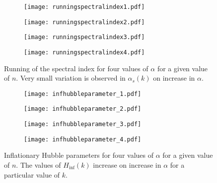 \documentclass[a4paper,11pt]{article}
\begin{document}
\begin{figure}[H]
\begin{subfigure}{0.52\linewidth}
  \centering
   \texttt{[image: runningspectralindex1.pdf]} 
   \subcaption{}
   \label{fig:RunningSpectralIndex1}
\end{subfigure}%
\begin{subfigure}{0.52\linewidth}
  \centering
   \texttt{[image: runningspectralindex2.pdf]}
   \subcaption{}
   \label{fig:RunningSpectralIndex2}
\end{subfigure}%
\vspace{0.1\linewidth}
\begin{subfigure}{0.52\linewidth}
  \centering
   \texttt{[image: runningspectralindex3.pdf]}
   \subcaption{}
    \label{fig:RunningSpectralIndex3}
\end{subfigure}%
\begin{subfigure}{0.52\linewidth}
  \centering
   \texttt{[image: runningspectralindex4.pdf]}
   \subcaption{}
    \label{fig:RunningSpectralIndex4}
\end{subfigure}
\caption{Running of the spectral index for four values of $\alpha$ for a given value of $n$. Very small variation is observed in $\alpha_s(k)$ on increase in $\alpha$.}
\label{fig:RunningSpectralIndex}
\end{figure}
\begin{figure}[H]
\begin{subfigure}{0.52\linewidth}
  \centering
   \texttt{[image: infhubbleparameter\_1.pdf]} 
   \subcaption{}
   \label{fig:InfHubbleParameter_1}
\end{subfigure}%
\begin{subfigure}{0.52\linewidth}
  \centering
   \texttt{[image: infhubbleparameter\_2.pdf]}
   \subcaption{}
   \label{fig:InfHubbleParameter_2}
\end{subfigure}%
\vspace{0.1\linewidth}
\begin{subfigure}{0.52\linewidth}
  \centering
   \texttt{[image: infhubbleparameter\_3.pdf]}
   \subcaption{}
    \label{fig:InfHubbleParameter_3}
\end{subfigure}%
\begin{subfigure}{0.52\linewidth}
  \centering
   \texttt{[image: infhubbleparameter\_4.pdf]}
   \subcaption{}
    \label{fig:InfHubbleParameter_4}
\end{subfigure}
\caption{Inflationary Hubble parameters for four values of $\alpha$ for a given value of $n$. The values of $H_{\mathrm{inf}}(k)$ increase on increase in $\alpha$ for a particular value of $k$.}
\label{fig:InfHubbleParameter}
\end{figure}
\end{document}
